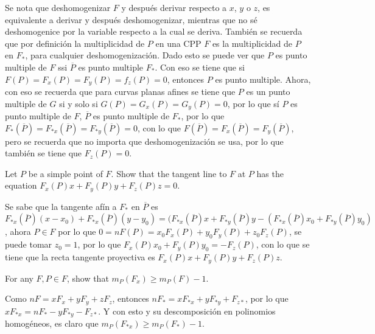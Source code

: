 \begin{sol}{5.1}
    Se nota que deshomogenizar \(F\) y después derivar respecto a \(x\), \(y\) o \(z\), es equivalente a derivar y después deshomogenizar, mientras que no sé deshomogenice por la variable respecto a la cual se deriva. También se recuerda que por definición la multiplicidad de \(P\) en una CPP \(F\) es la multiplicidad de \(P\) en \(F_*\), para cualquier deshomogenización. Dado esto se puede ver que \(P\) es punto multiple de \(F\) ssi \(\overline{P}\) es punto multiple \(F_*\). Con eso se tiene que si \(F(P)=F_x(P)=F_y(P)=f_z(P)=0\), entonces \(P\) es punto multiple. Ahora, con eso se recuerda que para curvas planas afines se tiene que \(P\) es un punto multiple de \(G\) si y solo si \(G(P)=G_x(P)=G_y(P)=0\), por lo que sí \(P\) es punto multiple de \(F\), \(\overline{P}\) es punto multiple de \(F_*\), por lo que \(F_*(\overline{P})=F_{*x}(\overline{P})=F_{*y}(\overline{P})=0\), con lo que \(F(\overline{P})=F_x(\overline{P})=F_y(\overline{P})\), pero se recuerda que no importa que deshomogenización se usa, por lo que también se tiene que \(F_z(P)=0\).
\end{sol}

\begin{prob}{5.4}
    Let \(P\) be a simple point of \(F\). Show that the tangent line to \(F\) at \(P\) has the equation \(F_x(P)x+F_y(P)y+F_z(P)z=0\).
\end{prob}

\begin{sol}{5.4}
    Se sabe que la tangente afín a \(F_*\) en \(\overline{P}\) es \(F_{*x}(\overline{P})(x-x_0)+F_{*x}(\overline{P})(y-y_0)=(F_{*x}(\overline{P})x+F_{*y}(\overline{P})y-(F_{*x}(\overline{P})x_0+F_{*y}(\overline{P})y_0)\), ahora \(P\in F\) por lo que \(0=nF(P)=x_0F_x(P)+y_0F_y(P)+z_0F_z(P)\), se puede tomar \(z_0=1\), por lo que \(F_{x}({P})x_0+F_{y}({P})y_0=-F_z(P)\), con lo que se tiene que la recta tangente proyectiva es \(F_x(P)x+F_y(P)y+F_z(P)z\).
\end{sol}

\begin{prob}{5.6}
    For any \(F,P\in F\), show that \(m_P(F_x)\geq m_P(F)-1\).
\end{prob}

\begin{sol}{5.6}
    Como \(nF=xF_x+yF_y+zF_z\), entonces \(nF_*=xF_{*x}+yF_{*y}+F_{z*}\), por lo que \(xF_{*x}=nF_*-yF_{*y}-F_{z*}\). Y con esto y su descomposición en polinomios homogéneos, es claro que \(m_P(F_{*x})\geq m_P(F_*)-1\).
\end{sol}

